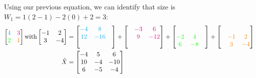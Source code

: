 \documentclass{article}
\begin{document}
{\color{blue}
Using our previous equation, we can identify that size is $W_1=1(2-1)-2(0)+2=3$:
\begin{equation}
    \begin{aligned}
        \begin{bmatrix}
            {\color{cyan}4}&{\color{magenta}3}\\
            {\color{green}2}&{\color{orange}1}
        \end{bmatrix} 
        \text{with} 
        \begin{bmatrix}
            -1&2\\
            3&-4
        \end{bmatrix} 
        &= 
        \begin{bmatrix}
            {\color{cyan}-4}&{\color{cyan}8}&\\
            {\color{cyan}12}&{\color{cyan}-16}&\\
            &&
        \end{bmatrix}
        +
        \begin{bmatrix}
            &{\color{magenta}-3}&{\color{magenta}6}\\
            &{\color{magenta}9}&{\color{magenta}-12}\\
            &&
        \end{bmatrix}
        +
        \begin{bmatrix}
            &&\\
            {\color{green}-2}&{\color{green}4}&\\
            {\color{green}6}&{\color{green}-8}&\\
        \end{bmatrix}
        +
        \begin{bmatrix}
            &&\\
            &{\color{orange}-1}&{\color{orange}2}\\
            &{\color{orange}3}&{\color{orange}-4}\\
        \end{bmatrix}\\
        \hat{X}&=
        \begin{bmatrix}
            -4&5&6\\
            10&-4&-10\\
            6&-5&-4
        \end{bmatrix} 
    \end{aligned}
\end{equation}

}
\end{document}
